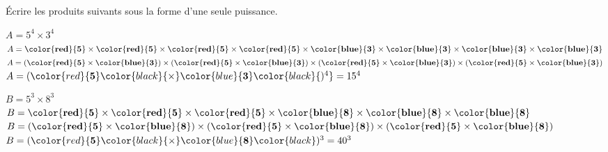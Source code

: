     Écrire les produits suivants sous la forme d'une seule puissance.

    \begin{itemize}
        \def\item{}
        \item $A=5^4\times 3^4$\\
        $A=\mathbf{\color{red}{5}} \times \mathbf{\color{red}{5}}\times \mathbf{\color{red}{5}} \times \mathbf{\color{red}{5}} \times \mathbf{\color{blue}{3}}\times \mathbf{\color{blue}{3}}\times \mathbf{\color{blue}{3}}\times \mathbf{\color{blue}{3}}$\\
        $A=(\mathbf{\color{red}{5}} \times \mathbf{\color{blue}{3}})\times (\mathbf{\color{red}{5}} \times \mathbf{\color{blue}{3}})\times (\mathbf{\color{red}{5}} \times \mathbf{\color{blue}{3}})\times (\mathbf{\color{red}{5}} \times \mathbf{\color{blue}{3}})$\\
        $A= (\color{red}{\mathbf{5}} \color{black}{\times} \color{blue}{\mathbf{3}}\color{black}{)^{4}}=15^4$

        \bigskip
        \item $B=5^3\times 8^3$\\
        $B=\mathbf{\color{red}{5}} \times \mathbf{\color{red}{5}}\times \mathbf{\color{red}{5}} \times \mathbf{\color{blue}{8}} \times \mathbf{\color{blue}{8}}\times \mathbf{\color{blue}{8}}$\\
        $B=(\mathbf{\color{red}{5}} \times \mathbf{\color{blue}{8}}) \times (\mathbf{\color{red}{5}} \times \mathbf{\color{blue}{8}})\times (\mathbf{\color{red}{5}} \times \mathbf{\color{blue}{8}})$\\
        $B= (\color{red}{\mathbf{5}} \color{black}{\times} \color{blue}{\mathbf{8}}\color{black})^{3}=40^3$

    \end{itemize}
    \Coupe

